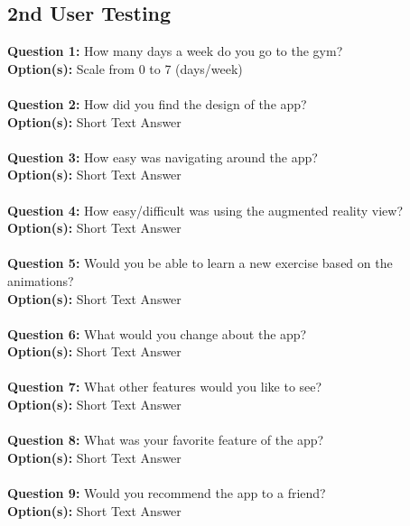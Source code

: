 \documentclass{l4proj}
\begin{document}
\begin{appendices}
\chapter{2nd User Testing}
\label{survey2}
\textbf{Question 1:} How many days a week do you go to the gym? \\
\textbf{Option(s):} Scale from 0 to 7 (days/week)
\\
\\
\textbf{Question 2:} How did you find the design of the app? \\
\textbf{Option(s):} Short Text Answer
\\
\\
\textbf{Question 3:} How easy was navigating around the app? \\
\textbf{Option(s):} Short Text Answer
\\
\\
\textbf{Question 4:} How easy/difficult was using the augmented reality view? \\
\textbf{Option(s):} Short Text Answer
\\
\\
\textbf{Question 5:} Would you be able to learn a new exercise based on the animations? \\
\textbf{Option(s):} Short Text Answer
\\
\\
\textbf{Question 6:} What would you change about the app? \\
\textbf{Option(s):} Short Text Answer
\\
\\
\textbf{Question 7:} What other features would you like to see? \\
\textbf{Option(s):} Short Text Answer
\\
\\
\textbf{Question 8:} What was your favorite feature of the app? \\
\textbf{Option(s):} Short Text Answer
\\
\\
\textbf{Question 9:} Would you recommend the app to a friend? \\
\textbf{Option(s):} Short Text Answer	

\end{appendices}




\end{document}
